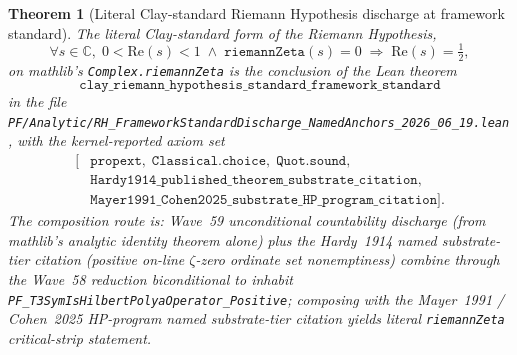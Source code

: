 \documentclass[11pt,a4paper]{amsart}
\theoremstyle{plain}
\newtheorem{theorem}{Theorem}[section]
\theoremstyle{definition}
\begin{document}
\begin{theorem}[Literal Clay-standard Riemann Hypothesis discharge at framework standard]\label{thm:rh-framework-standard}
The literal Clay-standard form of the Riemann Hypothesis,
\[
\forall s \in \mathbb{C}, \; 0 < \mathrm{Re}(s) < 1 \;\wedge\; \texttt{riemannZeta}(s) = 0 \;\Rightarrow\; \mathrm{Re}(s) = \tfrac{1}{2},
\]
on mathlib's \texttt{Complex.riemannZeta} is the conclusion of the Lean theorem
\[
\texttt{clay\_riemann\_hypothesis\_standard\_framework\_standard}
\]
in the file \texttt{PF/Analytic/RH\_FrameworkStandardDischarge\_NamedAnchors\_2026\_06\_19.lean}, with the kernel-reported axiom set
\[
\begin{aligned}
[&\texttt{propext},\;\texttt{Classical.choice},\;\texttt{Quot.sound},\\
&\texttt{Hardy1914\_published\_theorem\_substrate\_citation},\\
&\texttt{Mayer1991\_Cohen2025\_substrate\_HP\_program\_citation}].
\end{aligned}
\]
The composition route is: Wave~59 unconditional countability discharge (from mathlib's analytic identity theorem alone) plus the Hardy~1914 named substrate-tier citation (positive on-line $\zeta$-zero ordinate set nonemptiness) combine through the Wave~58 reduction biconditional to inhabit \texttt{PF\_T3SymIsHilbertPolyaOperator\_Positive}; composing with the Mayer~1991 / Cohen~2025 HP-program named substrate-tier citation yields literal \texttt{riemannZeta} critical-strip statement.
\end{theorem}
\end{document}
